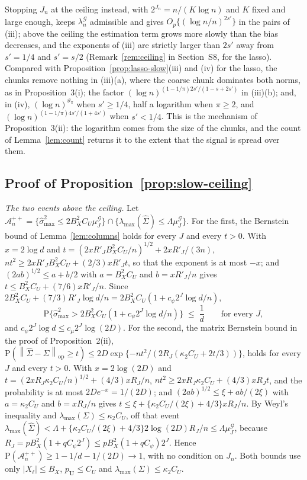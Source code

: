 \documentclass[10pt]{book}
\theoremstyle{definition}
\newcommand{\Prob}{\mathrm{P}}
\newcommand{\cv}{\ell}
\newcommand{\bU}{\mathbf{U}}
\newcommand{\Gram}{\Sigma}
\newcommand{\Gramhat}{\widehat{\Sigma}}
\newcommand{\seff}{s'}
\newcommand{\smax}{\widehat{\sigma}_{\max}}
\newcommand{\lmaxx}{\lambda_{\max}}
\newcommand{\opnorm}[1]{\left\lVert #1 \right\rVert_{\mathrm{op}}}
\newcommand{\Gcal}{\mathcal{G}}
\newcommand{\lamG}{\lambda^{\mathcal{G}}_{n}}
\newcommand{\Acal}{\mathcal{A}_{n}}
\begin{document}
{Stopping $J_n$ at the ceiling instead, with $2^{J_n} = n/(K\log n)$ and $K$
fixed and large enough, keeps $\lamG$ admissible and gives
$O_p\{(\log n/n)^{2\seff}\}$ in the pairs of (iii); above the ceiling the
estimation term grows more slowly than the bias decreases, and the exponents
of (iii) are strictly larger than $2\seff$ away from $\seff = 1/4$ and
$\seff = s/2$ (Remark~\ref{rem:ceiling} in Section~S8, for the lasso). Compared
with Proposition~\ref{prop:lasso-slow}(iii) and (iv) for the lasso, the chunks
remove nothing in (iii)(a), where the coarse chunk dominates both norms, as in
Proposition~3(i); the factor $(\log n)^{(1-1/\pi)2\seff/(1-s+2\seff)}$ in
(iii)(b); and, in (iv), $(\log n)^{\vartheta_{\pi}}$ when $\seff \ge 1/4$, half
a logarithm when $\pi \ge 2$, and $(\log n)^{(1-1/\pi)4\seff/(1+4\seff)}$ when
$\seff < 1/4$. This is the mechanism of Proposition~3(ii): the logarithm comes
from the size of the chunks, and the count of Lemma~\ref{lem:count} returns it
to the extent that the signal is spread over them.

\subsection*{Proof of Proposition~\ref{prop:slow-ceiling}}

\emph{The two events above the ceiling.} Let
$\Acal^{++} = \{\smax^{2} \le 2B_X^{2}C_U\mu^{\Gcal}_{J}\}\cap
\{\lmaxx(\Gramhat) \le \Lambda\mu^{\Gcal}_{J}\}$. For the first, the Bernstein
bound of Lemma~\ref{lem:columns} holds for every $J$ and every $t > 0$. With
$x = 2\log d$ and $t = (2xR'_JB_X^{2}C_U/n)^{1/2} + 2xR'_J/(3n)$,
$nt^{2} \ge 2xR'_JB_X^{2}C_U + (2/3)xR'_Jt$, so that the exponent is at most
$-x$; and $(2ab)^{1/2} \le a + b/2$ with $a = B_X^{2}C_U$ and $b = xR'_J/n$
gives $t \le B_X^{2}C_U + (7/6)xR'_J/n$. Since
$2B_X^{2}C_U + (7/3)R'_J\log d/n = 2B_X^{2}C_U(1 + c_{\psi}2^{J}\log d/n)$,
\begin{equation}
  \label{eq:smax-ceiling}
  \Prob\bigl\{\smax^{2} > 2B_X^{2}C_U(1 + c_{\psi}2^{J}\log d/n)\bigr\}
  \;\le\; \frac{1}{d}
  \qquad\text{for every } J,
\end{equation}
and $c_{\psi}2^{J}\log d \le c_{\mu}2^{J}\log(2D)$. For the second, the matrix
Bernstein bound in the proof of Proposition~2(ii),
$\Prob(\opnorm{\Gramhat-\Gram} \ge t) \le
2D\exp\{-nt^{2}/(2R_J(\kappa_2C_U + 2t/3))\}$, holds for every $J$ and every
$t > 0$. With $x = 2\log(2D)$ and
$t = (2xR_J\kappa_2C_U/n)^{1/2} + (4/3)xR_J/n$,
$nt^{2} \ge 2xR_J\kappa_2C_U + (4/3)xR_Jt$, and the probability is at most
$2De^{-x} = 1/(2D)$; and $(2ab)^{1/2} \le \xi + ab/(2\xi)$ with
$a = \kappa_2C_U$ and $b = xR_J/n$ gives
$t \le \xi + \{\kappa_2C_U/(2\xi) + 4/3\}xR_J/n$. By Weyl's inequality and
$\lmaxx(\Gram) \le \kappa_2C_U$, off that event
$\lmaxx(\Gramhat) < \Lambda + \{\kappa_2C_U/(2\xi) + 4/3\}2\log(2D)R_J/n \le
\Lambda\mu^{\Gcal}_{J}$, because
$R_J = pB_X^{2}(1 + qC_\psi2^{J}) \le pB_X^{2}(1+qC_\psi)2^{J}$. Hence
$\Prob(\Acal^{++}) \ge 1 - 1/d - 1/(2D) \to 1$, with no condition on $J_n$.
Both bounds use only $|X_{\cv}| \le B_X$, $p_{\bU} \le C_U$ and
$\lmaxx(\Gram) \le \kappa_2C_U$.

}
\end{document}
